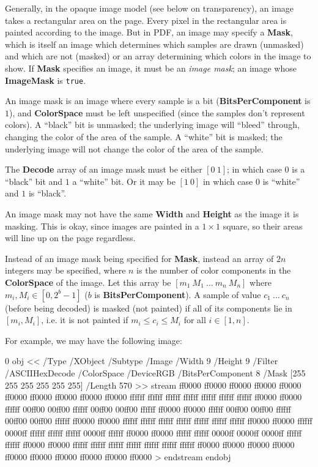 
Generally, in the opaque image model (see below on transparency), an image takes a rectangular area on the
page.
Every pixel in the rectangular area is painted according to the image.
But in PDF, an image may specify a {\bf Mask}, which is itself an image which determines which samples are
drawn (unmasked) and which are not (masked) or an array determining which colors in the image to show.
If {\bf Mask} specifies an image, it must be an {\it image mask}; an image whose {\bf ImageMask} is {\tt true}.

An image mask is an image where every sample is a bit ({\bf BitsPerComponent} is $1$), and {\bf ColorSpace}
must be left unspecified (since the samples don't represent colors).
A ``black'' bit is unmasked; the underlying image will ``bleed'' through, changing the color of the
area of the sample.
A ``white'' bit is masked; the underlying image will not change the color of the area of the sample.

The {\bf Decode} array of an image mask must be either $[0\ 1]$; in which case $0$ is a ``black'' bit and
$1$ a ``white'' bit.
Or it may be $[1\ 0]$ in which case $0$ is ``white'' and $1$ is ``black''.

An image mask may not have the same {\bf Width} and {\bf Height} as the image it is masking.
This is okay, since images are painted in a $1\times1$ square, so their areas will line up on the page
regardless.


Instead of an image mask being specified for {\bf Mask}, instead an array of $2n$ integers may be specified,
where $n$ is the number of color components in the {\bf ColorSpace} of the image.
Let this array be $[m_1\ M_1\ \dots\ m_n\ M_n]$ where $m_i,M_i\in[0,2^b-1]$ ($b$ is {\bf BitsPerComponent}).
A sample of value $c_1\ \dots\ c_n$ (before being decoded) is masked (not painted) if all of its components
lie in $[m_i,M_i]$, i.e. it is not painted if $m_i\leq c_i\leq M_i$ for all $i\in[1,n]$.

For example, we may have the following image:

 0 obj
<<
    /Type /XObject
    /Subtype /Image
    /Width 9
    /Height 9
    /Filter /ASCIIHexDecode
    /ColorSpace /DeviceRGB
    /BitsPerComponent 8
    /Mask [255 255 255 255 255 255]
    /Length 570
>>
stream
    ff0000 ff0000 ff0000 ff0000 ff0000 ff0000 ff0000 ff0000 ff0000 
    ff0000 ffffff ffffff ffffff ffffff ffffff ffffff ffffff ff0000 
    ff0000 ffffff 00ff00 00ff00 ffffff 00ff00 00ff00 ffffff ff0000 
    ff0000 ffffff 00ff00 00ff00 ffffff 00ff00 00ff00 ffffff ff0000 
    ff0000 ffffff ffffff ffffff ffffff ffffff ffffff ffffff ff0000 
    ff0000 ffffff 0000ff ffffff ffffff ffffff 0000ff ffffff ff0000 
    ff0000 ffffff ffffff 0000ff 0000ff 0000ff ffffff ffffff ff0000 
    ff0000 ffffff ffffff ffffff ffffff ffffff ffffff ffffff ff0000 
    ff0000 ff0000 ff0000 ff0000 ff0000 ff0000 ff0000 ff0000 ff0000 >
endstream
endobj
\elisting

